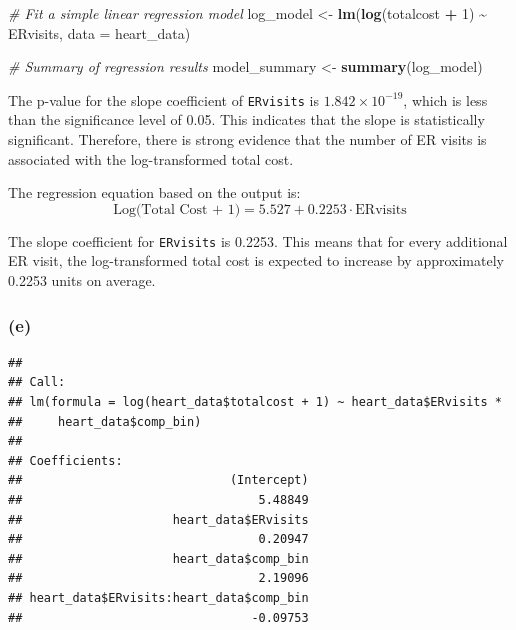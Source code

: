 \documentclass[
]{article}
\newenvironment{Shaded}{\begin{snugshade}}{\end{snugshade}}
\newcommand{\AttributeTok}[1]{\textcolor[rgb]{0.13,0.29,0.53}{#1}}
\newcommand{\CommentTok}[1]{\textcolor[rgb]{0.56,0.35,0.01}{\textit{#1}}}
\newcommand{\DecValTok}[1]{\textcolor[rgb]{0.00,0.00,0.81}{#1}}
\newcommand{\FunctionTok}[1]{\textcolor[rgb]{0.13,0.29,0.53}{\textbf{#1}}}
\newcommand{\NormalTok}[1]{#1}
\newcommand{\OtherTok}[1]{\textcolor[rgb]{0.56,0.35,0.01}{#1}}
\newcommand{\SpecialCharTok}[1]{\textcolor[rgb]{0.81,0.36,0.00}{\textbf{#1}}}
\begin{document}
\begin{Shaded}
\begin{Highlighting}[]
\CommentTok{\# Fit a simple linear regression model}
\NormalTok{log\_model }\OtherTok{\textless{}{-}} \FunctionTok{lm}\NormalTok{(}\FunctionTok{log}\NormalTok{(totalcost }\SpecialCharTok{+} \DecValTok{1}\NormalTok{) }\SpecialCharTok{\textasciitilde{}}\NormalTok{ ERvisits, }\AttributeTok{data =}\NormalTok{ heart\_data)}


\CommentTok{\# Summary of regression results}
\NormalTok{model\_summary }\OtherTok{\textless{}{-}} \FunctionTok{summary}\NormalTok{(log\_model)}
\end{Highlighting}
\end{Shaded}

The p-value for the slope coefficient of \texttt{ERvisits} is
\ensuremath{1.842\times 10^{-19}}, which is less than the significance
level of 0.05. This indicates that the slope is statistically
significant. Therefore, there is strong evidence that the number of ER
visits is associated with the log-transformed total cost.

The regression equation based on the output is: \[
\text{Log(Total Cost + 1)} = 5.527 + 0.2253 \cdot \text{ERvisits}
\]

The slope coefficient for \texttt{ERvisits} is 0.2253. This means that
for every additional ER visit, the log-transformed total cost is
expected to increase by approximately 0.2253 units on average.

\subsubsection{(e)}\label{e-1}

\begin{Shaded}
\end{Shaded}

\begin{verbatim}
## 
## Call:
## lm(formula = log(heart_data$totalcost + 1) ~ heart_data$ERvisits * 
##     heart_data$comp_bin)
## 
## Coefficients:
##                             (Intercept)  
##                                 5.48849  
##                     heart_data$ERvisits  
##                                 0.20947  
##                     heart_data$comp_bin  
##                                 2.19096  
## heart_data$ERvisits:heart_data$comp_bin  
##                                -0.09753
\end{verbatim}
\end{document}
